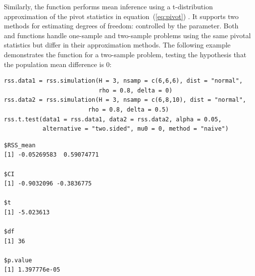 Similarly, the  function performs mean inference using a t-distribution approximation of the pivot statistics in equation~(\ref{eq:pivot}) \citep{Ahn:2014}. It supports two methods for estimating degrees of freedom:  controlled by the  parameter.  Both  and  functions handle one-sample and two-sample problems using the same pivotal statistics but differ in their approximation methods. The following example demonstrates the  function for a two-sample problem, testing the hypothesis that the population mean difference is 0:
%
\begin{verbatim}
rss.data1 = rss.simulation(H = 3, nsamp = c(6,6,6), dist = "normal", 
                           rho = 0.8, delta = 0)
rss.data2 = rss.simulation(H = 3, nsamp = c(6,8,10), dist = "normal", 
                        rho = 0.8, delta = 0.5)
rss.t.test(data1 = rss.data1, data2 = rss.data2, alpha = 0.05, 
           alternative = "two.sided", mu0 = 0, method = "naive")
\end{verbatim}
\begin{verbatim}
$RSS_mean
[1] -0.05269583  0.59074771

$CI
[1] -0.9032096 -0.3836775

$t
[1] -5.023613

$df
[1] 36

$p.value
[1] 1.397776e-05
\end{verbatim}
%

